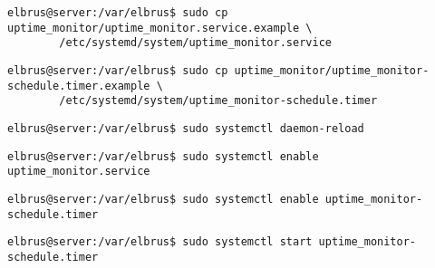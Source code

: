 	\lstset{style=commands}
	\begin{lstlisting}[caption={Kopieren des Serviceprogrammes.}]
		elbrus@server:/var/elbrus$ sudo cp uptime_monitor/uptime_monitor.service.example \
		/etc/systemd/system/uptime_monitor.service
	\end{lstlisting}
	
	\lstset{style=commands}
	\begin{lstlisting}[caption={Kopieren des Zeitplanungsprogrammes.}]
		elbrus@server:/var/elbrus$ sudo cp uptime_monitor/uptime_monitor-schedule.timer.example \
		/etc/systemd/system/uptime_monitor-schedule.timer
	\end{lstlisting}
	
	\lstset{style=commands}
	\begin{lstlisting}[caption={Neuladen des 'systemctl' Deamons.}]
		elbrus@server:/var/elbrus$ sudo systemctl daemon-reload
	\end{lstlisting}
	
	\lstset{style=commands}
	\begin{lstlisting}[caption={Aktivieren des Serviceprogrammes.}]
		elbrus@server:/var/elbrus$ sudo systemctl enable uptime_monitor.service
	\end{lstlisting}
	
	\lstset{style=commands}
	\begin{lstlisting}[caption={Aktivieren des Zeitplanungsprogrammes.}]
		elbrus@server:/var/elbrus$ sudo systemctl enable uptime_monitor-schedule.timer
	\end{lstlisting}
	
	\lstset{style=commands}
	\begin{lstlisting}[caption={Starten des Zeitplanungsprogrammes.}]
		elbrus@server:/var/elbrus$ sudo systemctl start uptime_monitor-schedule.timer
	\end{lstlisting}